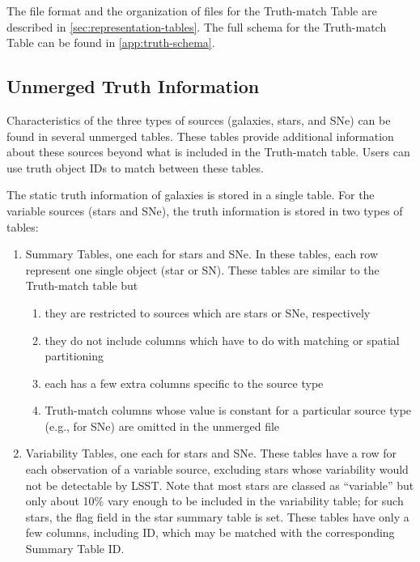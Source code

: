\documentclass[modern]{descnote}
\begin{document}
The file format and the organization of files for the Truth-match Table are described in \autoref{sec:representation-tables}. The full schema for the Truth-match Table can be found in \autoref{app:truth-schema}.


\subsection{Unmerged Truth Information}
\label{sec:truth-unmerged}

Characteristics of the three types of sources (galaxies, stars, and SNe) can be found in several unmerged tables. These tables provide additional information about these sources beyond what is included in the Truth-match table. Users can use truth object IDs to match between these tables. 

The static truth information of galaxies is stored in a single table. For the variable sources (stars and SNe), the truth information is stored in two types of tables:
\begin{enumerate}
    \item Summary Tables, one each for stars and SNe. In these tables, each row represent one single object (star or SN). These tables are similar to the Truth-match table but
    \begin{enumerate}
        \item they are restricted to sources which are stars or SNe, respectively
        \item they do not include columns which have to do with matching or spatial partitioning
        \item each has a few extra columns specific to the source type
        \item Truth-match columns whose value is constant for a particular source type (e.g.,  for SNe) are omitted in the unmerged file
    \end{enumerate}
    \item Variability Tables, one each for stars and SNe. These tables have a row for each observation of a variable source, excluding stars whose variability would not be detectable by LSST. Note that most stars are classed as ``variable'' but only about 10\% vary enough to be included in the variability table; for such stars, the flag field  in the star summary table is set. These tables have only a few columns, including ID, which may be matched with the corresponding Summary Table ID.
   
\end{enumerate}
\end{document}
